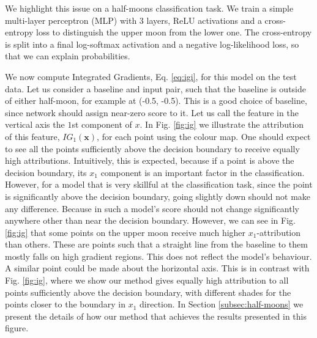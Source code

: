 We highlight this issue on a half-moons classification task. We train a simple multi-layer perceptron (MLP) with 3 layers, ReLU activations and a cross-entropy loss to distinguish the upper moon from the lower one. The cross-entropy is split into a final log-softmax activation and a negative log-likelihood loss, so that we can explain probabilities.

We now compute Integrated Gradients, Eq. \ref{eq:igi}, for this model on the test data. Let us consider a baseline and input pair, such that the baseline is outside of either half-moon, for example at (-0.5, -0.5). This is a good choice of baseline, since network should assign near-zero score to it. Let us call the feature in the vertical axis the $1$st component of $x$. In Fig. \ref{fig:ig} we illustrate the attribution of this feature, $IG_1(\textbf{x})$, for each point using the colour map. One should expect to see all the points sufficiently above the decision boundary to receive equally high attributions. Intuitively, this is expected, because if a point is above the decision boundary, its $x_1$ component is an important factor in the classification. However, for a model that is very skillful at the classification task, since the point is significantly above the decision boundary, going slightly down should not make any difference. Because in such a model's score should not change significantly anywhere other than near the decision boundary. However, we can see in Fig. \ref{fig:ig} that some points on the upper moon receive much higher $x_1$-attribution than others. These are points such that a straight line from the baseline to them mostly falls on high gradient regions. This does not reflect the model's behaviour. A similar point could be made about the horizontal axis. This is in contrast with Fig. \ref{fig:ig}, where we show our method gives equally high attribution to all points sufficiently above the decision boundary, with different shades for the points closer to the boundary in $x_1$ direction. In Section \ref{subsec:half-moons} we present the details of how our method that achieves the results presented in this figure.

